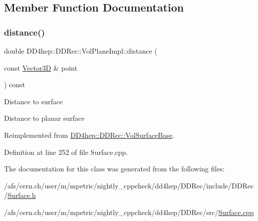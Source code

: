 \subsection{Member Function Documentation}
\hypertarget{class_d_d4hep_1_1_d_d_rec_1_1_vol_plane_impl_a5c94e22dfc7011f6ebcf40bae215bf31}{}\label{class_d_d4hep_1_1_d_d_rec_1_1_vol_plane_impl_a5c94e22dfc7011f6ebcf40bae215bf31} 
\subsubsection{\texorpdfstring{distance()}{distance()}}
{\footnotesize\ttfamily double D\+D4hep\+::\+D\+D\+Rec\+::\+Vol\+Plane\+Impl\+::distance (\begin{DoxyParamCaption}\item[{const \hyperlink{class_d_d_surfaces_1_1_vector3_d}{Vector3D} \&}]{point }\end{DoxyParamCaption}) const\hspace{0.3cm}{\ttfamily [virtual]}}

Distance to surface

Distance to planar surface 

Reimplemented from \hyperlink{class_d_d4hep_1_1_d_d_rec_1_1_vol_surface_base_aefb278e0429219871c47b602a2593fef}{D\+D4hep\+::\+D\+D\+Rec\+::\+Vol\+Surface\+Base}.



Definition at line 252 of file Surface.\+cpp.



The documentation for this class was generated from the following files\+:\begin{DoxyCompactItemize}
\item 
/afs/cern.\+ch/user/m/mpetric/nightly\+\_\+cppcheck/dd4hep/\+D\+D\+Rec/include/\+D\+D\+Rec/\hyperlink{_surface_8h}{Surface.\+h}\item 
/afs/cern.\+ch/user/m/mpetric/nightly\+\_\+cppcheck/dd4hep/\+D\+D\+Rec/src/\hyperlink{_surface_8cpp}{Surface.\+cpp}\end{DoxyCompactItemize}
